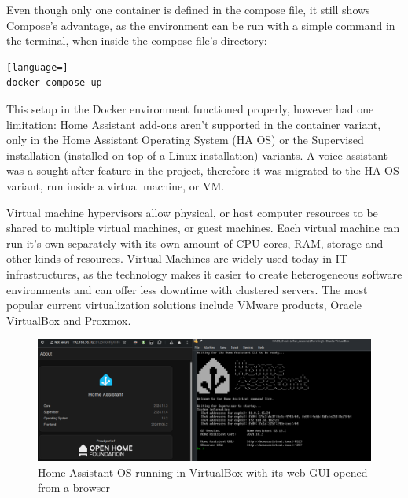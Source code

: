 Even though only one container is defined in the compose file, it still shows Compose's advantage, as the environment can be run with a simple command in the terminal, when inside the compose file's directory:

\begin{lstlisting}[language=]
docker compose up
\end{lstlisting}

This setup in the Docker environment functioned properly, however had one limitation: Home Assistant add-ons aren't supported in the container variant, only in the Home Assistant Operating System (HA OS) or the Supervised installation (installed on top of a Linux installation) variants. \cite{HAaddons} A voice assistant was a sought after feature in the project, therefore it was migrated to the HA OS variant, run inside a virtual machine, or VM.

Virtual machine hypervisors allow physical, or host computer resources to be shared to multiple virtual machines, or guest machines. \cite{VMwareVM} Each virtual machine can run it's own separately with its own amount of CPU cores, RAM, storage and other kinds of resources. Virtual Machines are widely used today in IT infrastructures, as the technology makes it easier to create heterogeneous software environments and can offer less downtime with clustered servers. The most popular current virtualization solutions include VMware products, Oracle VirtualBox and Proxmox. \cite{G2freeVM}

\begin{figure}[!ht]
  \centering
  \includegraphics[width=150mm, keepaspectratio]{figures/homeassistant_about.png}
  \caption{Home Assistant OS running in VirtualBox with its web GUI opened from a browser}
  \label{fig:HAabout}
\end{figure}

